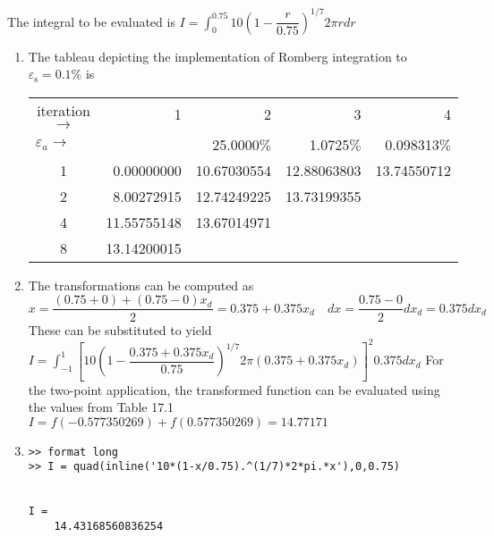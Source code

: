\documentclass[../main.tex]{subfiles}
\begin{document}
\section{}
The integral to be evaluated is
	\bigbreak
$\displaystyle I=\int_{0}^{0.75} 10\left(1-\dfrac{r}{0.75}\right)^{1 / 7} 2 \pi r d r$
	\bigbreak
\begin{enumerate}[label=\bfseries(\alph*)]
\item The tableau depicting the implementation of Romberg integration to $\varepsilon_{\mathrm{s}}=0.1 \%$ is
	\bigbreak
\begin{tabular}{lrrrr}
\multicolumn{1}{c}{iteration $\rightarrow$} & 1 & 2 & 3 & 4 \\
$\varepsilon_{a} \rightarrow$ &  &25.0000$\%$&1.0725$\%$&0.098313$\%$\\
\multicolumn{1}{c}{1}&0.00000000&10.67030554&12.88063803&13.74550712\\
\multicolumn{1}{c}{2}&8.00272915&12.74249225&13.73199355\\
\multicolumn{1}{c}{4}&11.55755148&13.67014971\\
\multicolumn{1}{c}{8}&13.14200015\\
\end{tabular}
	\bigbreak
\item The transformations can be computed as
	\bigbreak
$x=\dfrac{(0.75+0)+(0.75-0) x_{d}}{2}=0.375+0.375 x_{d} \quad d x=\dfrac{0.75-0}{2} d x_{d}=0.375 d x_{d}$
	\bigbreak
These can be substituted to yield
	\bigbreak
$\displaystyle I=\int_{-1}^{1}\left[10\left(1-\dfrac{0.375+0.375 x_{d}}{0.75}\right)^{1 / 7} 2 \pi\left(0.375+0.375 x_{d}\right)\right]^{2} 0.375 d x_{d}$
	\bigbreak
For the two-point application, the transformed function can be evaluated using the values from Table 17.1
	\bigbreak
$I=f (-0.577350269) + f (0.577350269) =14.77171$
	\bigbreak
\item
\begin{lstlisting}[numbers=none]
>> format long
>> I = quad(inline('10*(1-x/0.75).^(1/7)*2*pi.*x'),0,0.75)


I =
	14.43168560836254
\end{lstlisting}
\end{enumerate}
	\bigbreak
\end{document}
